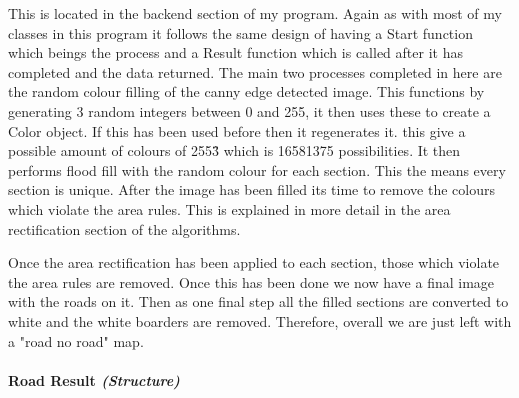 \begin{FlushLeft}
    This is located in the backend section of my program. Again as with most of my classes in this program it follows the same design of having a Start function which beings the process and a Result function which is called after it has completed and the data returned. The main two processes completed in here are the random colour filling of the canny edge detected image. This functions by generating 3 random integers between 0 and 255, it then uses these to create a Color object. If this has been used before then it regenerates it. this give a possible amount of colours of 255\^3 which is 16581375 possibilities. It then performs flood fill with the random colour for each section. This the means every section is unique. After the image has been filled its time to remove the colours which violate the area rules. This is explained in more detail in the area rectification section of the algorithms. \\ \bk

    Once the area rectification has been applied to each section, those which violate the area rules are removed. Once this has been done we now have a final image with the roads on it. Then as one final step all the filled sections are converted to white and the white boarders are removed. Therefore, overall we are just left with a "road no road" map.\\

    \bk

    \pagebreak
\paragraph{Road Result \textit{(Structure)}} \mbox{} \\

    \begin{figure}[H]
        \centering
    \end{figure}\\


\end{FlushLeft}
